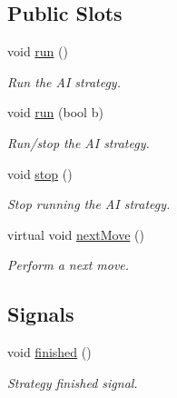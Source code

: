 \subsection*{Public Slots}
\begin{DoxyCompactItemize}
\item 
void \hyperlink{classWorldStrategy_a819fd63464c5816220868c0c4c2fb413}{run} ()
\begin{DoxyCompactList}\small\item\em Run the AI strategy. \end{DoxyCompactList}\item 
void \hyperlink{classWorldStrategy_a674ac2dea0846db429bba274c3104ae3}{run} (bool b)
\begin{DoxyCompactList}\small\item\em Run/stop the AI strategy. \end{DoxyCompactList}\item 
void \hyperlink{classWorldStrategy_a1393a72f34bbe7044efb9887985df1fa}{stop} ()\hypertarget{classWorldStrategy_a1393a72f34bbe7044efb9887985df1fa}{}\label{classWorldStrategy_a1393a72f34bbe7044efb9887985df1fa}

\begin{DoxyCompactList}\small\item\em Stop running the AI strategy. \end{DoxyCompactList}\item 
virtual void \hyperlink{classWorldStrategy_abeaeccebfb752aa139a9551566417743}{next\+Move} ()
\begin{DoxyCompactList}\small\item\em Perform a next move. \end{DoxyCompactList}\end{DoxyCompactItemize}
\subsection*{Signals}
\begin{DoxyCompactItemize}
\item 
void \hyperlink{classWorldStrategy_ad84ca7c1936416ab4c5b7419349fc81e}{finished} ()
\begin{DoxyCompactList}\small\item\em Strategy finished signal. \end{DoxyCompactList}\end{DoxyCompactItemize}
